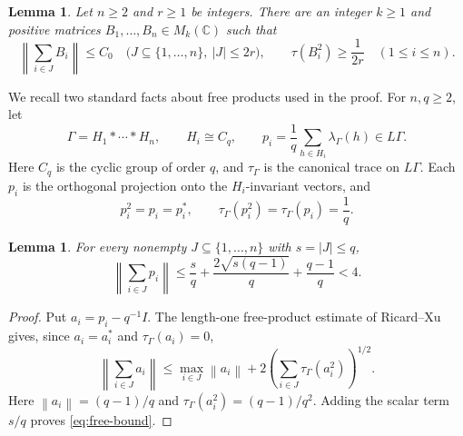\documentclass[a4paper,11pt]{amsproc}
\numberwithin{equation}{section}
\newtheorem{lemma}[theorem]{Lemma}
\theoremstyle{definition}
\newcommand{\C}{\mathbb C}
\newcommand{\norm}[1]{\left\lVert#1\right\rVert}
\begin{document}
\begin{lemma}\label{lem:matrices}
Let $n\ge2$ and $r\ge1$ be integers. There are an integer $k\ge1$ and positive matrices $B_1,\ldots,B_n\in M_k(\C)$ such that
\begin{equation}\label{eq:matrix-properties}
 \norm{\sum_{i\in J}B_i}\le C_0\quad
 \bigl(J\subseteq\{1,\ldots,n\},\ |J|\le2r\bigr),
 \qquad \tau(B_i^2)\ge\frac1{2r}\quad(1\le i\le n).
\end{equation}
\end{lemma}

We recall two standard facts about free products used in the proof. For $n,q\ge2$, let
\begin{equation}\label{eq:free-product}
 \Gamma=H_1*\cdots*H_n,\qquad H_i\cong C_q,
 \qquad p_i=\frac1q\sum_{h\in H_i}\lambda_\Gamma(h)\in L\Gamma.
\end{equation}
Here $C_q$ is the cyclic group of order $q$, and $\tau_\Gamma$ is the canonical trace on $L\Gamma$. Each $p_i$ is the orthogonal projection onto the $H_i$-invariant vectors, and
\begin{equation}\label{eq:projection-trace}
 p_i^2=p_i=p_i^*,\qquad
 \tau_\Gamma(p_i^2)=\tau_\Gamma(p_i)=\frac1q.
\end{equation}

\begin{lemma}\label{lem:free-bound}
For every nonempty $J\subseteq\{1,\ldots,n\}$ with $s=|J|\le q$,
\begin{equation}\label{eq:free-bound}
 \norm{\sum_{i\in J}p_i}
 \le\frac{s}{q}+\frac{2\sqrt{s(q-1)}}q+\frac{q-1}{q}<4.
\end{equation}
\end{lemma}
\begin{proof}
Put $a_i=p_i-q^{-1}I$. The length-one free-product estimate of Ricard--Xu \cite[Lemmas 2.1--2.3 and Corollary 2.4]{rx} gives, since $a_i=a_i^*$ and $\tau_\Gamma(a_i)=0$,
\[
 \norm{\sum_{i\in J}a_i}
 \le\max_{i\in J}\norm{a_i}
     +2\left(\sum_{i\in J}\tau_\Gamma(a_i^2)\right)^{1/2}.
\]
Here $\norm{a_i}=(q-1)/q$ and $\tau_\Gamma(a_i^2)=(q-1)/q^2$. Adding the scalar term $s/q$ proves \eqref{eq:free-bound}.
\end{proof}
\end{document}
